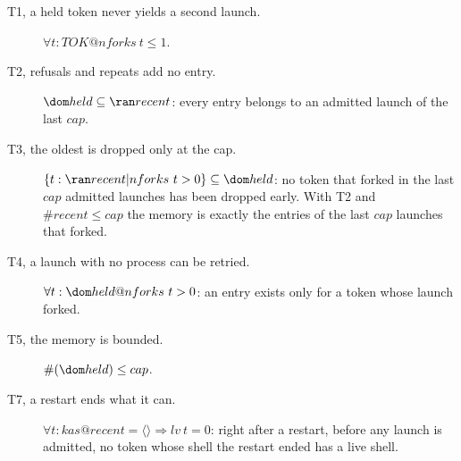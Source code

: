 \documentclass[a4paper,10pt,fleqn]{article}
\begin{document}
\begin{description}
  \item[T1, a held token never yields a second launch.]
    $\forall t : TOK @ nforks~t \leq 1$.
  \item[T2, refusals and repeats add no entry.]
    $\dom held \subseteq \ran recent$: every entry belongs to an admitted
    launch of the last $cap$.
  \item[T3, the oldest is dropped only at the cap.]
    $\{ t : \ran recent | nforks~t > 0 \} \subseteq \dom held$: no token that
    forked in the last $cap$ admitted launches has been dropped early.  With T2
    and $\# recent \leq cap$ the memory is exactly the entries of the last
    $cap$ launches that forked.
  \item[T4, a launch with no process can be retried.]
    $\forall t : \dom held @ nforks~t > 0$: an entry exists only for a token
    whose launch forked.
  \item[T5, the memory is bounded.] $\# (\dom held) \leq cap$.
  \item[T7, a restart ends what it can.] $\forall t : kas @ recent = \langle \rangle \Rightarrow lv~t = 0$: right after a restart, before any launch is admitted, no token whose shell the restart ended has a live shell.
\end{description}
\end{document}
